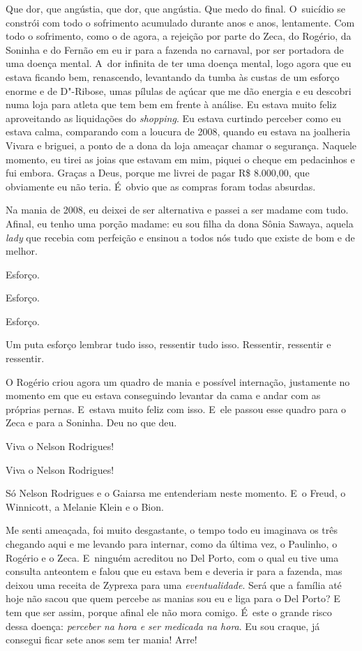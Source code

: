 Que dor, que angústia, que dor, que angústia. Que medo do final. O~suicídio se constrói com todo o sofrimento acumulado durante anos e
anos, lentamente. Com todo o sofrimento, como o de agora, a rejeição por
parte do Zeca, do Rogério, da Soninha e do Fernão em eu ir para a
fazenda no carnaval, por ser portadora de uma doença mental. A~dor
infinita de ter uma doença mental, logo agora que eu estava ficando bem,
renascendo, levantando da tumba às custas de um esforço enorme e de
D"-Ribose, umas pílulas de açúcar que me dão energia e eu descobri numa
loja para atleta que tem bem em frente à análise. Eu estava muito feliz
aproveitando as liquidações do \emph{shopping}. Eu estava curtindo
perceber como eu estava calma, comparando com a loucura de 2008, quando
eu estava na joalheria Vivara e briguei, a ponto de a dona da loja
ameaçar chamar o segurança. Naquele momento, eu tirei as joias que
estavam em mim, piquei o cheque em pedacinhos e fui embora. Graças a
Deus, porque me livrei de pagar R\$ 8.000,00, que obviamente eu não
teria. É~obvio que as compras foram todas absurdas.

Na mania de 2008, eu deixei de ser alternativa e passei a ser madame com
tudo. Afinal, eu tenho uma porção madame: eu sou filha da dona Sônia
Sawaya, aquela \emph{lady} que recebia com perfeição e ensinou a todos
nós tudo que existe de bom e de melhor.

Esforço.

Esforço.

Esforço.

Um puta esforço lembrar tudo isso, ressentir tudo isso. Ressentir,
ressentir e ressentir.

O Rogério criou agora um quadro de mania e possível internação,
justamente no momento em que eu estava conseguindo levantar da cama e
andar com as próprias pernas. E~estava muito feliz com isso. E~ele
passou esse quadro para o Zeca e para a Soninha. Deu no que deu.

Viva o Nelson Rodrigues!

Viva o Nelson Rodrigues!

Só Nelson Rodrigues e o Gaiarsa me entenderiam neste momento. E~o Freud,
o Winnicott, a Melanie Klein e o Bion.

Me senti ameaçada, foi muito desgastante, o tempo todo eu imaginava os
três chegando aqui e me levando para internar, como da última vez, o
Paulinho, o Rogério e o Zeca. E~ninguém acreditou no Del Porto, com o
qual eu tive uma consulta anteontem e falou que eu estava bem e deveria
ir para a fazenda, mas deixou uma receita de Zyprexa para uma
\emph{eventualidade}. Será que a família até hoje não sacou que quem
percebe as manias sou eu e liga para o Del Porto? E tem que ser assim,
porque afinal ele não mora comigo. É~este o grande risco dessa doença:
\emph{perceber na hora e ser medicada na hora}. Eu sou craque, já
consegui ficar sete anos sem ter mania! Arre!

